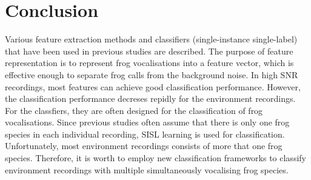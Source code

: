 \section{Conclusion}
Various feature extraction methods and classifiers (single-instance single-label) that have been used in previous studies are described. The purpose of feature representation is to represent frog vocalisations into a feature vector, which is effective enough to separate frog calls from the background noise. In high SNR recordings, most features can achieve good classification performance. However, the classification performance decreses repidly for the environment recordings. For the classfiers, they are often designed for the classification of frog vocalisations. Since previous studies often assume that there is only one frog species in each individual recording, SISL learning is used for classification. Unfortunately, most environment recordings consists of more that one frog species. Therefore, it is worth to employ new classification frameworks to classify environment recordings with multiple simultaneously vocalising frog species.


